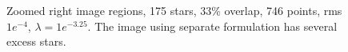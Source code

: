 \begin{figure}[h!]
\hspace{-0.18in}
		\hspace{-0.18in}
\caption [Zoomed right image regions, 175 stars, 33\% overlap, 746 points,  rms $1e^{-4}$, $\lambda = 1e^{-3.25}$]{Zoomed right image regions, 175 stars, 33\% overlap, 746 points, rms $1e^{-4}$, $\lambda = 1e^{-3.25}$.  The image using separate formulation has several excess stars.}
\label{fig:expt18}
\end{figure}

